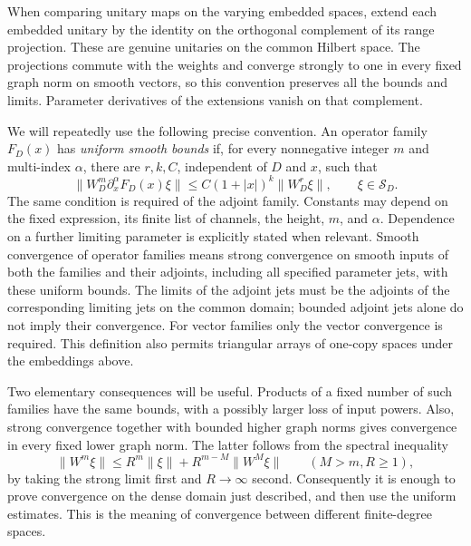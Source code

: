 When comparing unitary maps on the varying embedded spaces,
extend each embedded unitary by the identity on the orthogonal
complement of its range projection.  These are genuine
unitaries on the common Hilbert space.  The projections commute
with the weights and converge strongly to one in every fixed
graph norm on smooth vectors, so this convention preserves
all the bounds and limits.  Parameter derivatives of the
extensions vanish on that complement.

We will repeatedly use the following precise convention.  An
operator family $F_D(x)$ has \emph{uniform smooth bounds} if, for
every nonnegative integer $m$ and multi-index $\alpha$, there are
$r,k,C$, independent of $D$ and $x$, such that
\begin{equation}\label{eq:smooth-family-bound}
 \|W_D^m\partial_x^\alpha F_D(x)\xi\|
 \leq C(1+|x|)^k\|W_D^r\xi\|,
 \qquad \xi\in\mathscr S_D.
\end{equation}
The same condition is required of the adjoint family.  Constants
may depend on the fixed expression, its finite list of channels,
the height, $m$, and $\alpha$.  Dependence on a further limiting
parameter is explicitly stated when relevant.  Smooth convergence
of operator families means strong convergence on smooth inputs
of both the families and their adjoints, including all specified
parameter jets, with these uniform bounds.  The limits of the
adjoint jets must be the adjoints of the corresponding limiting
jets on the common domain; bounded adjoint jets alone do not
imply their convergence.  For vector families only the vector
convergence is required.  This definition also permits triangular
arrays of one-copy spaces under the embeddings above.

Two elementary consequences will be useful.  Products of a fixed
number of such families have the same bounds, with a possibly
larger loss of input powers.  Also, strong convergence together
with bounded higher graph norms gives convergence in every fixed
lower graph norm.  The latter follows from the spectral inequality
\begin{equation}\label{eq:weight-interpolation}
 \|W^m\xi\|\leq R^m\|\xi\|
       +R^{m-M}\|W^M\xi\|\qquad(M>m, R\geq1),
\end{equation}
by taking the strong limit first and $R\to\infty$ second.
Consequently it is enough to prove convergence on the dense domain
just described, and then use the uniform estimates.  This is the
meaning of convergence between different finite-degree spaces.

